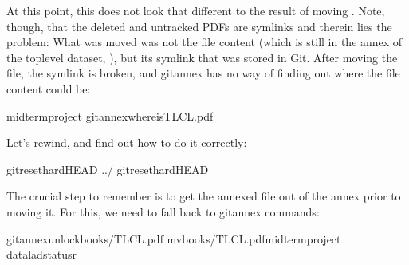 \sphinxAtStartPar
At this point, this does not look that different to the result of moving
. Note, though, that the deleted and untracked PDFs are symlinks \textendash{}
and therein lies the problem: What was moved was not the file content (which is
still in the annex of the top\sphinxhyphen{}level dataset, ), but its symlink that
was stored in Git. After moving the file, the symlink is broken, and git\sphinxhyphen{}annex
has no way of finding out where the file content could be:

\begin{sphinxVerbatim}[commandchars=\\\{\}]
midterm\PYGZus{}project
gitannexwhereisTLCL.pdf
\end{sphinxVerbatim}

\sphinxAtStartPar
Let’s rewind, and find out how to do it correctly:

\begin{sphinxVerbatim}[commandchars=\\\{\}]
gitreset\PYGZhy{}\PYGZhy{}hardHEAD\PYGZti{}
../
gitreset\PYGZhy{}\PYGZhy{}hardHEAD\PYGZti{}
\end{sphinxVerbatim}

\sphinxAtStartPar
The crucial step to remember is to get the annexed file out of the annex prior
to moving it. For this, we need to fall back to git\sphinxhyphen{}annex commands:

\begin{sphinxVerbatim}[commandchars=\\\{\}]
gitannexunlockbooks/TLCL.pdf
mvbooks/TLCL.pdfmidterm\PYGZus{}project
dataladstatus\PYGZhy{}r
\end{sphinxVerbatim}

